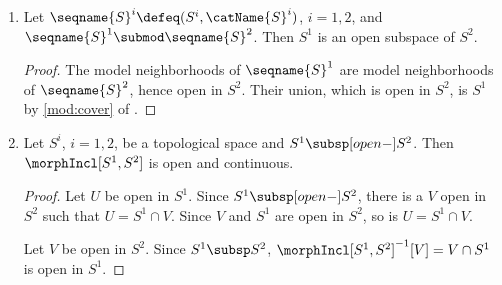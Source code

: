 \documentclass{article}
\begin{document}
\begin{lemma}
\begin{enumerate}
\begin{proof}
Let
$
  \seqname{T} = \bigl ( (T.\topname{T}), \catName{T} \bigr )
  \defeq \Mod(T,\seqname{S})
$.

\begin{enumerate}
\item
$\seqname{S}$ and $\seqname{T}$ are model spaces.

\item
$T$ is a subspace of $S$.

\item
$\catName{T} \subcat \catName{S}$ by construction.

\item
Let $U \objin \seqname{S}$. $U \cap T \objin \seqname{S}$. Since
$U \cap T \subseteq T$ is a model neighborhood of $\seqname{S}$, it is a
model neighborhood of $\Mod(T,\seqname{S})$ by construction.

\item
Let $U \objin \seqname{S}$ be contained in $T$. Then $U$ is a model
neighborhood of $\Mod(T,\seqname{S})$ by construction.
\end{enumerate}
\end{proof}

\item
Let $\seqname{S}^i \defeq (S^i,\catName{S}^i)$, $i=1,2$, and
$\seqname{S}^1 \submod \seqname{S}^2$.
Then $S^1$ is an open subspace of $S^2$.

\begin{proof}
The model neighborhoods of $\seqname{S}^1$ are model neighborhoods of
$\seqname{S}^2$, hence open in $S^2$. Their union, which is open in
$S^2$, is $S^1$ by \cref{mod:cover} of
{
  \showlabelsinline
}.
\end{proof}

\item
Let $S^i$, $i=1,2$, be a topological space and $S^1 \subsp[open-] S^2$.
Then $\morphIncl[S^1,S^2]$ is open and continuous.

\begin{proof}
Let $U$ be open in $S^1$.
Since $S^1 \subsp[open-] S^2$, there is a $V$ open in $S^2$ such that
$U = S^1 \cap V$.  Since $V$ and $S^1$ are open in $S^2$, so is
$U = S^1 \cap V$.

Let $V$ be open in $S^2$. Since $S^1 \subsp S^2$,
${\morphIncl[S^1,S^2]}^{-1}[V] = V \cap S^1$ is open in $S^1$.
\end{proof}
\end{enumerate}
\end{lemma}
\end{document}
